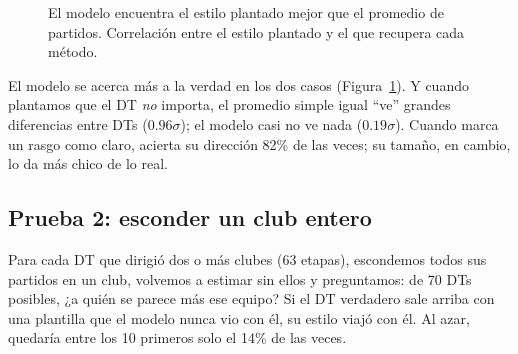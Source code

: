 \documentclass[10pt,a4paper,twocolumn]{article}
\begin{document}
\begin{figure}[H]
\centering
{}
\caption{El modelo encuentra el estilo plantado mejor que el promedio de partidos. Correlación entre el estilo plantado y el que recupera cada método.}
\label{fig:sintetico}
\end{figure}

El modelo se acerca más a la verdad en los dos casos (Figura~\ref{fig:sintetico}). Y cuando plantamos que el DT \emph{no} importa, el promedio simple igual ``ve'' grandes diferencias entre DTs ($0.96\sigma$); el modelo casi no ve nada ($0.19\sigma$). Cuando marca un rasgo como claro, acierta su dirección 82\% de las veces; su tamaño, en cambio, lo da más chico de lo real.

\subsection{Prueba 2: esconder un club entero}
Para cada DT que dirigió dos o más clubes (63 etapas), escondemos todos sus partidos en un club, volvemos a estimar sin ellos y preguntamos: de 70 DTs posibles, ¿a quién se parece más ese equipo? Si el DT verdadero sale arriba con una plantilla que el modelo nunca vio con él, su estilo viajó con él. Al azar, quedaría entre los 10 primeros solo el 14\% de las veces.
\end{document}
